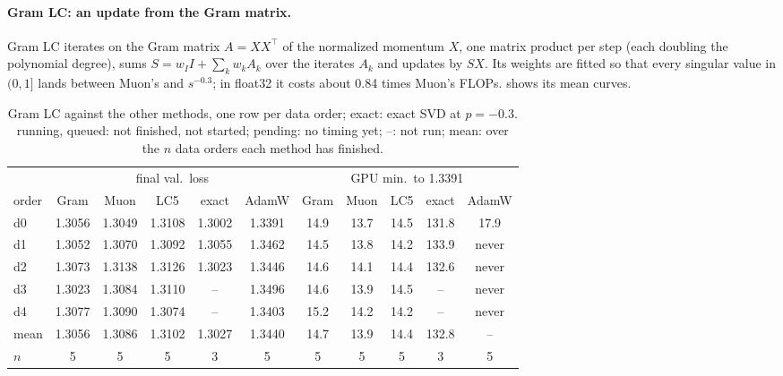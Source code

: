 \paragraph{Gram LC: an update from the Gram matrix.} Gram LC iterates on the Gram matrix $A=XX^\top$ of the normalized momentum $X$, one matrix product per step (each doubling the polynomial degree), sums $S=w_I I+\sum_k w_k A_k$ over the iterates $A_k$ and updates by $SX$. Its weights are fitted so that every singular value in $(0,1]$ lands between Muon's and $s^{-0.3}$; in float32 it costs about 0.84 times Muon's FLOPs.  shows its mean curves.

\begin{table}[H]
\centering
\small
\caption{Gram LC against the other methods, one row per data order; exact: exact SVD at $p=-0.3$. running, queued: not finished, not started; pending: no timing yet; --: not run; mean: over the $n$ data orders each method has finished.}
\label{tab:gram}
\setlength{\tabcolsep}{3.5pt}
\begin{tabular}{l ccccc ccccc}
\toprule
 & \multicolumn{5}{c}{final val.\ loss} & \multicolumn{5}{c}{GPU min.\ to 1.3391} \\
\cmidrule(lr){2-6}\cmidrule(lr){7-11}
order & Gram & Muon & LC5 & exact & AdamW & Gram & Muon & LC5 & exact & AdamW \\
\midrule
d0 & 1.3056 & 1.3049 & 1.3108 & 1.3002 & 1.3391 & 14.9 & 13.7 & 14.5 & 131.8 & 17.9 \\
d1 & 1.3052 & 1.3070 & 1.3092 & 1.3055 & 1.3462 & 14.5 & 13.8 & 14.2 & 133.9 & never \\
d2 & 1.3073 & 1.3138 & 1.3126 & 1.3023 & 1.3446 & 14.6 & 14.1 & 14.4 & 132.6 & never \\
d3 & 1.3023 & 1.3084 & 1.3110 & -- & 1.3496 & 14.6 & 13.9 & 14.5 & -- & never \\
d4 & 1.3077 & 1.3090 & 1.3074 & -- & 1.3403 & 15.2 & 14.2 & 14.2 & -- & never \\
\midrule
mean & 1.3056 & 1.3086 & 1.3102 & 1.3027 & 1.3440 & 14.7 & 13.9 & 14.4 & 132.8 & -- \\
$n$ & 5 & 5 & 5 & 3 & 5 & 5 & 5 & 5 & 3 & 5 \\
\bottomrule
\end{tabular}
\end{table}
